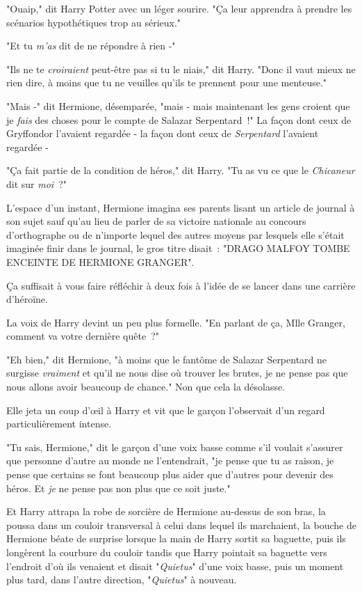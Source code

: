 "Ouaip," dit Harry Potter avec un léger sourire. "Ça leur apprendra à prendre les scénarios hypothétiques trop au sérieux."

"Et tu \emph{m'as} dit de ne répondre à rien -"

"Ils ne te \emph{croiraient} peut-être pas si tu le niais," dit Harry. "Donc il vaut mieux ne rien dire, à moins que tu ne veuilles qu'ils te prennent pour une menteuse."

"Mais -" dit Hermione, désemparée, "mais - mais maintenant les gens croient que je \emph{fais} des choses pour le compte de Salazar Serpentard~!" La façon dont ceux de Gryffondor l'avaient regardée - la façon dont ceux de \emph{Serpentard} l'avaient regardée -

"Ça fait partie de la condition de héros," dit Harry. "Tu as vu ce que le \emph{Chicaneur} dit sur \emph{moi}~?"

L'espace d'un instant, Hermione imagina ses parents lisant un article de journal à son sujet sauf qu'au lieu de parler de sa victoire nationale au concours d'orthographe ou de n'importe lequel des autres moyens par lesquels elle s'était imaginée finir dans le journal, le gros titre disait~: "DRAGO MALFOY TOMBE ENCEINTE DE HERMIONE GRANGER".

Ça suffisait à vous faire réfléchir à deux fois à l'idée de se lancer dans une carrière d'héroïne.

La voix de Harry devint un peu plus formelle. "En parlant de ça, Mlle Granger, comment va votre dernière quête~?"

"Eh bien," dit Hermione, "à moins que le fantôme de Salazar Serpentard ne surgisse \emph{vraiment} et qu'il ne nous dise où trouver les brutes, je ne pense pas que nous allons avoir beaucoup de chance." Non que cela la désolasse.

Elle jeta un coup d'œil à Harry et vit que le garçon l'observait d'un regard particulièrement intense.

"Tu sais, Hermione," dit le garçon d'une voix basse comme s'il voulait s'assurer que personne d'autre au monde ne l'entendrait, "je pense que tu as raison, je pense que certains se font beaucoup plus aider que d'autres pour devenir des héros. Et \emph{je} ne pense pas non plus que ce soit juste."

Et Harry attrapa la robe de sorcière de Hermione au-dessus de son bras, la poussa dans un couloir transversal à celui dans lequel ils marchaient, la bouche de Hermione béate de surprise lorsque la main de Harry sortit sa baguette, puis ils longèrent la courbure du couloir tandis que Harry pointait sa baguette vers l'endroit d'où ils venaient et disait "\emph{Quietus}" d'une voix basse, puis un moment plus tard, dans l'autre direction, "\emph{Quietus}" à nouveau.

